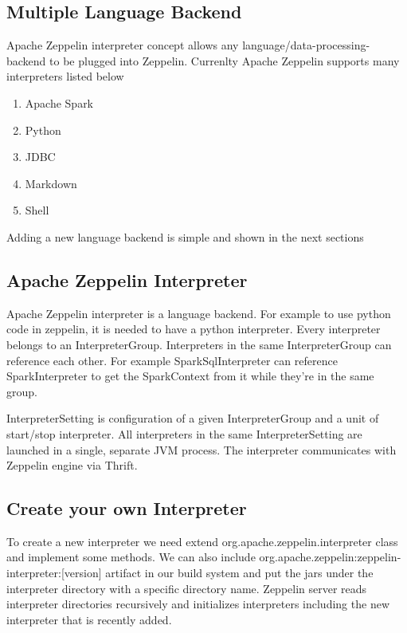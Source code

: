 \documentclass[9pt,twocolumn,twoside]{../../styles/osajnl}
\begin{document}
\subsection{Multiple Language Backend}

Apache Zeppelin interpreter concept allows any 
language/data-processing-backend to be plugged into Zeppelin. 
Currenlty Apache Zeppelin supports many interpreters listed below

\begin{enumerate}
	\item Apache Spark
	\item Python
	\item JDBC
	\item Markdown
	\item Shell
\end{enumerate}

Adding a new language backend is simple and shown in the next sections

\subsection{Apache Zeppelin Interpreter}

Apache Zeppelin interpreter is a language backend. For example to use 
python code in zeppelin, it is needed to have a python interpreter. 
Every interpreter belongs to an InterpreterGroup. Interpreters in the 
same InterpreterGroup can reference each other. For example 
SparkSqlInterpreter can reference SparkInterpreter to get the 
SparkContext from it while they're in the same group.

InterpreterSetting is configuration of a given InterpreterGroup and a 
unit of start/stop interpreter. All interpreters in the same 
InterpreterSetting are launched in a single, separate JVM process. 
The interpreter communicates with Zeppelin engine via Thrift.

\subsection{Create your own Interpreter}

To create a new interpreter we need extend 
org.apache.zeppelin.interpreter class and implement some methods. We 
can also include org.apache.zeppelin:zeppelin-interpreter:[version] 
artifact in our build system and put the jars under the interpreter 
directory with a specific directory name. Zeppelin server reads 
interpreter directories recursively and initializes interpreters 
including the new interpreter that is recently added.
\end{document}
